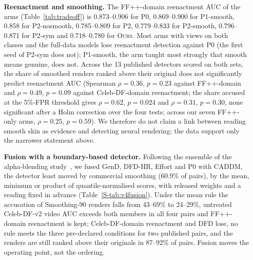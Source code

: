 \documentclass[conference]{IEEEtran}
\newcommand{\ours}{\textsc{Ours}}
\begin{document}
\textbf{Reenactment and smoothing.} The FF++-domain reenactment AUC of the arms (Table~\ref{tab:tradeoff}) is 0.873--0.906 for P0,
0.869--0.900 for P1-smooth, 0.858 for P2-nosmooth, 0.785--0.809 for P2, 0.779--0.833 for P2-smooth, 0.796--0.871 for P2-sym and
0.718--0.780 for \ours{}. Most arms with views on both classes and the full-data models lose reenactment detection against P0
(the first seed of P2-sym does not); P1-smooth, the arm taught most strongly that smooth means genuine, does not. Across the 13 published detectors scored on both sets, the
share of smoothed renders ranked above their original does not significantly predict reenactment AUC (Spearman $\rho=0.36$, $p=0.23$ against FF++-domain and $\rho=0.49$, $p=0.09$ against Celeb-DF-domain reenactment; the share accused at the 5\%-FPR threshold gives $\rho=0.62$, $p=0.024$ and $\rho=0.31$, $p=0.30$, none significant after a Holm correction over the four tests; across our seven FF++-only arms, $\rho=0.25$, $p=0.59$). We
therefore do not claim a link between reading smooth skin as evidence and detecting neural rendering; the data support only the
narrower statement above.

\textbf{Fusion with a boundary-based detector.} Following the ensemble of the alpha-blending study~\cite{alphablend2026}, we fused
GenD, DFD-HR, Effort and P0 with CADDM, the detector least moved by commercial smoothing (60.9\% of pairs), by the mean, minimum or
product of quantile-normalised scores, with released weights and a reading fixed in advance (Table~\ref{S-tab:v4fusion}). Under
the mean rule the accusation of Smoothing-90 renders falls from 43--69\% to 24--29\%, untreated Celeb-DF-v2 video AUC exceeds both
members in all four pairs and FF++-domain reenactment is kept; Celeb-DF-domain reenactment and DFD lose, no rule meets the three
pre-declared conditions for two published pairs, and the renders are still ranked above their originals in 87--92\% of pairs.
Fusion moves the operating point, not the ordering.
\end{document}
